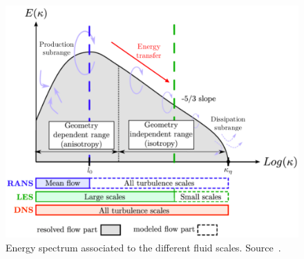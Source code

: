 \begin{figure}[!ht]
\centering
\includegraphics[width=\linewidth,keepaspectratio]{fig/applications/ls89/energy_cascade.png}
\caption{Energy spectrum associated to the different fluid scales. Source~\cite{Fransen2013}.}
\label{fig:energy_cascade}
\end{figure}





